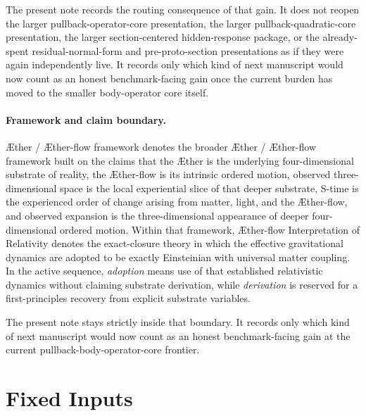 \documentclass[11pt]{article}
\newcommand{\Aether}{\AE{}ther}
\newcommand{\Aflow}{\AE{}ther-flow}
\newcommand{\TheoryName}{\Aflow{} Interpretation of Relativity}
\newcommand{\TheoryProgram}{\Aether{} / \Aflow{} framework}
\begin{document}
The present note records the routing consequence of that gain. It does not reopen the larger pullback-operator-core presentation, the larger pullback-quadratic-core presentation, the larger section-centered hidden-response package, or the already-spent residual-normal-form and pre-proto-section presentations as if they were again independently live. It records only which kind of next manuscript would now count as an honest benchmark-facing gain once the current burden has moved to the smaller body-operator core itself.

\paragraph{Framework and claim boundary.}
\TheoryProgram{} denotes the broader \Aether{} / \Aflow{} framework built on the claims that the \Aether{} is the underlying four-dimensional substrate of reality, the \Aflow{} is its intrinsic ordered motion, observed three-dimensional space is the local experiential slice of that deeper substrate, S-time is the experienced order of change arising from matter, light, and the \Aflow{}, and observed expansion is the three-dimensional appearance of deeper four-dimensional ordered motion. Within that framework, \TheoryName{} denotes the exact-closure theory in which the effective gravitational dynamics are adopted to be exactly Einsteinian with universal matter coupling. In the active sequence, \emph{adoption} means use of that established relativistic dynamics without claiming substrate derivation, while \emph{derivation} is reserved for a first-principles recovery from explicit substrate variables.

The present note stays strictly inside that boundary. It records only which kind of next manuscript would now count as an honest benchmark-facing gain at the current pullback-body-operator-core frontier.

\section{Fixed Inputs}
\end{document}
